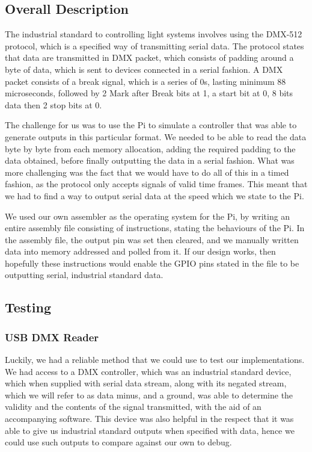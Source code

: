 \documentclass[11pt,a4paper]{article}
\begin{document}
\subsection{Overall Description}

The industrial standard to controlling light systems involves using the DMX-512 protocol, which is a specified way of transmitting serial data. The protocol states that data are transmitted in DMX packet, which consists of padding around a byte of data, which is sent to devices connected in a serial fashion. A DMX packet consists of a break signal, which is a series of 0s, lasting minimum 88 microseconds, followed by 2 Mark after Break bits at 1, a start bit at 0, 8 bits data then 2 stop bits at 0.

The challenge for us was to use the Pi to simulate a controller that was able to generate outputs in this particular format. We needed to be able to read the data byte by byte from each memory allocation, adding the required padding to the data obtained, before finally outputting the data in a serial fashion. What was more challenging was the fact that we would have to do all of this in a timed fashion, as the protocol only accepts signals of valid time frames. This meant that we had to find a way to output serial data at the speed which we state to the Pi. 

We used our own assembler as the operating system for the Pi, by writing an entire assembly file consisting of instructions, stating the behaviours of the Pi. In the assembly file, the output pin was set then cleared, and we manually written data into memory addressed and polled from it. If our design works, then hopefully these instructions would enable the GPIO pins stated in the file to be outputting serial, industrial standard data.

\subsection{Testing}

\subsubsection{USB DMX Reader}
Luckily, we had a reliable method that we could use to test our implementations. We had access to a DMX controller, which was an industrial standard device, which when supplied with serial data stream, along with its negated stream, which we will refer to as data minus, and a ground, was able to determine the validity and the contents of the signal transmitted, with the aid of an accompanying software. This device was also helpful in the respect that it was able to give us industrial standard outputs when specified with data, hence we could use such outputs to compare against our own to debug.
\end{document}
